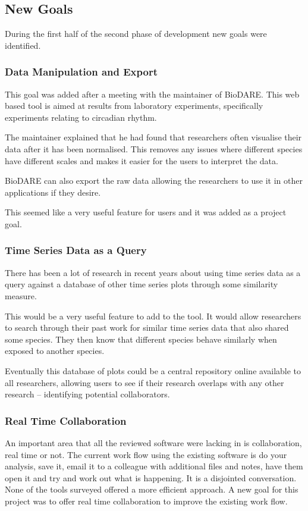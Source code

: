 \subsection{New Goals}
During the first half of the second phase of development new goals were identified.

\subsubsection{Data Manipulation and Export}

This goal was added after a meeting with the maintainer of BioDARE.  This web based tool is aimed at results from laboratory experiments, specifically experiments relating to circadian rhythm.

The maintainer explained that he had found that researchers often visualise their data after it has been normalised.  This removes any issues where different species have different scales and makes it easier for the users to interpret the data.

BioDARE can also export the raw data allowing the researchers to use it in other applications if they desire.

This seemed like a very useful feature for users and it was added as a project goal.

\subsubsection{Time Series Data as a Query}

There has been a lot of research in recent years about using time series data as a query against a database of other time series plots through some similarity measure.

This would be a very useful feature to add to the tool.  It would allow researchers to search through their past work for similar time series data that also shared some species. They then know that different species behave similarly when exposed to another species.

Eventually this database of plots could be a central repository online available to all researchers, allowing users to see if their research overlaps with any other research -- identifying potential collaborators.

\subsubsection{Real Time Collaboration}

An important area that all the reviewed software were lacking in is collaboration, real time or not.  The current work flow using the existing software is do your analysis, save it, email it to a colleague with additional files and notes, have them open it and try and work out what is happening.  It is a disjointed conversation.  None of the tools surveyed offered a more efficient approach.  A new goal for this project was to offer real time collaboration to improve the existing work flow.
